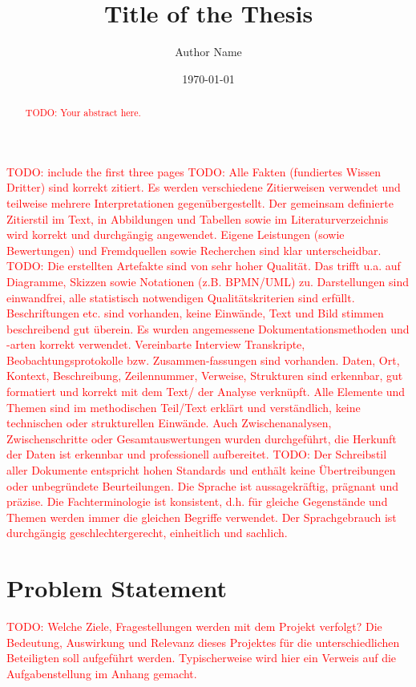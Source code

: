 \documentclass[a4paper,12pt]{report}
\title{Title of the Thesis}
\author{Author Name}
\date{\today}
\renewcommand{\todo}[1]{\textcolor{red}{TODO: #1}}
\begin{document}
	
	\maketitle
	
	\begin{abstract}
		\todo{Your abstract here.}
	\end{abstract}
	
	\tableofcontents
	\listoftodos
	
	\todo{include the first three pages}
	\todo{Alle Fakten (fundiertes Wissen Dritter) sind korrekt zitiert. Es werden verschiedene Zitierweisen verwendet und teilweise mehrere Interpretationen gegenübergestellt. Der gemeinsam definierte Zitierstil im Text, in Abbildungen und Tabellen sowie im Literaturverzeichnis wird korrekt und durchgängig angewendet. Eigene Leistungen (sowie Bewertungen) und Fremdquellen sowie Recherchen sind klar unterscheidbar.}
	\todo{Die erstellten Artefakte sind von sehr hoher Qualität. Das trifft u.a. auf Diagramme, Skizzen sowie Notationen (z.B. BPMN/UML) zu. Darstellungen sind einwandfrei, alle statistisch notwendigen Qualitätskriterien sind erfüllt. Beschriftungen etc. sind vorhanden, keine Einwände, Text und Bild stimmen beschreibend gut überein. Es wurden angemessene Dokumentationsmethoden und -arten korrekt verwendet. Vereinbarte Interview Transkripte, Beobachtungsprotokolle bzw. Zusammen-fassungen sind vorhanden. Daten, Ort, Kontext, Beschreibung, Zeilennummer, Verweise, Strukturen sind erkennbar, gut formatiert und korrekt mit dem Text/ der Analyse verknüpft. Alle Elemente und Themen sind im methodischen Teil/Text erklärt und verständlich, keine technischen oder strukturellen Einwände. Auch Zwischenanalysen, Zwischenschritte oder Gesamtauswertungen wurden durchgeführt, die Herkunft der Daten ist erkennbar und professionell aufbereitet.}
	\todo{Der Schreibstil aller Dokumente entspricht hohen Standards und enthält keine Übertreibungen oder unbegründete Beurteilungen. Die Sprache ist aussagekräftig, prägnant und präzise. Die Fachterminologie ist konsistent, d.h. für gleiche Gegenstände und Themen werden immer die gleichen Begriffe verwendet. Der Sprachgebrauch ist durchgängig geschlechtergerecht, einheitlich und sachlich.}
	
	
	\chapter{Problem Statement}
		\todo{Welche Ziele, Fragestellungen werden mit dem Projekt verfolgt? Die Bedeutung, Auswirkung und Relevanz	dieses Projektes für die unterschiedlichen Beteiligten soll aufgeführt werden. Typischerweise wird hier ein Verweis auf die Aufgabenstellung im Anhang gemacht.}
	
\end{document}
